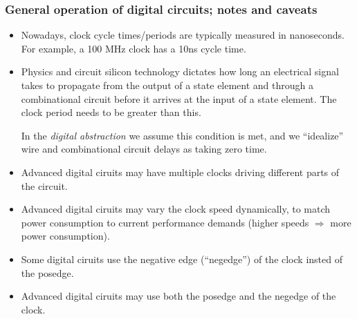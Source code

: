 \begin{frame}
\frametitle{General operation of digital circuits; notes and caveats}

\begin{itemize}
 \item Nowadays, clock cycle times/periods are typically measured in
       nanoseconds. \\
       For example, a 100 MHz clock has a 10ns cycle time.

 \item Physics and circuit silicon technology dictates how long an
       electrical signal takes to propagate from the output of a state
       element and through a combinational circuit before it arrives
       at the input of a state element.  The clock period needs to be
       greater than this.

       In the \emph{digital abstraction} we assume this condition is
       met, and we ``idealize'' wire and combinational circuit delays
       as taking zero time.

\end{itemize}

\vspace{2ex}

\begin{itemize}

 \item Advanced digital ciruits may have multiple clocks driving
       different parts of the circuit.

 \item Advanced digital ciruits may vary the clock speed dynamically,
       to match power consumption to current performance demands
       (higher speeds $\Rightarrow$ more power consumption).

 \item Some digital ciruits use the negative edge (``negedge'') of the
       clock insted of the posedge.

 \item Advanced digital ciruits may use both the posedge and the
       negedge of the clock.

\end{itemize}

\end{frame}


